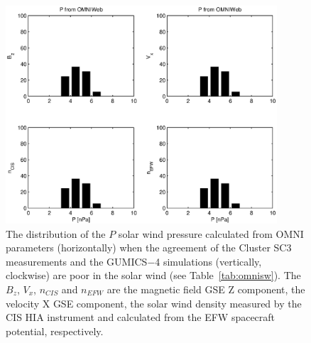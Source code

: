 \documentclass[linenumbers,draft]{agujournal}
\begin{document}
\begin{figure}[h]
\centering
\includegraphics[width=0.9\textwidth,angle=0]{swe-2020-corr-f15.eps}  
\caption{The distribution of the $P$ solar wind pressure calculated from OMNI parameters (horizontally) when the agreement of the Cluster SC3 measurements and the GUMICS$-$4 simulations (vertically, clockwise) are poor in the solar wind (see Table~\ref{tab:omnisw}). The $B_{z}$, $V_{x}$, $n_{CIS}$ and $n_{EFW}$ are the magnetic field GSE Z component, the velocity X GSE component, the solar wind density measured by the CIS HIA instrument and calculated from the EFW spacecraft potential, respectively.}
\label{fig:swomnip}
\end{figure}

\pagebreak
\end{document}
